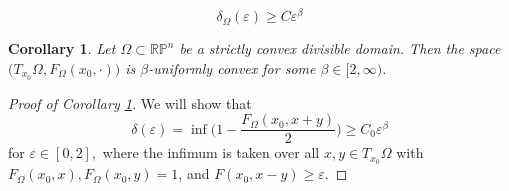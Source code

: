 \documentclass[10pt,a4paper]{amsart}
\newtheorem{cor}{Corollary}
\begin{document}
\begin{equation}\label{eqn:betauc}
    \delta_\Omega(\varepsilon) \geq C\varepsilon^\beta
\end{equation}

\begin{cor}\label{cor:mainfinsler}
    Let $\Omega \subset \mathbb{RP}^n$ be a strictly convex divisible domain. Then the space $\big(T_{x_0}\Omega, F_\Omega(x_0, \cdot)\big)$ is $\beta$-uniformly convex for some $\beta \in [2, \infty)$.
\end{cor}

\begin{proof}[Proof of Corollary \ref{cor:mainfinsler}]

 We will show that 
 \begin{equation}\label{FisBUC}
        \delta(\varepsilon) = \inf \bigg(1-\frac{F_\Omega(x_0,x+y)}{2}\bigg) \geq C_0 \varepsilon^\beta
    \end{equation}
    for $\varepsilon \in [0,2],$ where the infimum is taken over all $x,y \in T_{x_0}\Omega$ with $F_\Omega(x_0,x), F_\Omega(x_0,y) = 1$, and $F(x_0,x-y) \geq \varepsilon$.


\end{proof}
\end{document}
